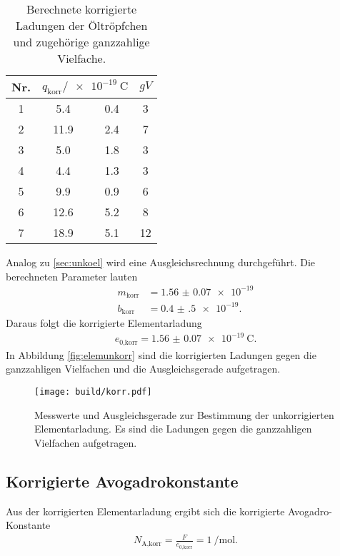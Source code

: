 \begin{table}[h]
  \centering
  \begin{tabular}{S S @{${}\pm{}$} S S}
    \toprule
    {Nr.} &  & {$gV$}\\
     & 5.4  & 0.4 & 3 \\
    2 & 11.9 & 2.4 & 7 \\
    3 & 5.0  & 1.8 & 3 \\
    4 & 4.4  & 1.3 & 3 \\
    5 & 9.9  & 0.9 & 6 \\
    6 & 12.6 & 5.2 & 8 \\
    7 & 18.9 & 5.1 & 12\\
    \bottomrule
  \end{tabular}
  \caption{Berechnete korrigierte Ladungen der Öltröpfchen und zugehörige
  ganzzahlige Vielfache.}
  \label{tab:Ladungenkorr}
\end{table}

\FloatBarrier

Analog zu \ref{sec:unkoel} wird eine Ausgleichsrechnung durchgeführt.
Die berechneten Parameter lauten
\begin{align}
  m_\text{korr} & = \num{1.56(7)e-19} \\
  b_\text{korr} & = \num{0.4(5)e-19}.
\end{align}
Daraus folgt die korrigierte Elementarladung
\begin{align}
  e_\text{0,korr} = \SI{1.56(7)e-19}{\coulomb}.
\end{align}
In Abbildung \ref{fig:elemunkorr} sind die korrigierten Ladungen gegen die ganzzahligen
Vielfachen und die Ausgleichsgerade aufgetragen.

\begin{figure}
  \centering
  \texttt{[image: build/korr.pdf]}
  \caption{Messwerte und Ausgleichsgerade zur Bestimmung der unkorrigierten Elementarladung.
  Es sind die Ladungen gegen die ganzzahligen Vielfachen aufgetragen.}
  \label{fig:elemkorr}
\end{figure}

\FloatBarrier

\subsection{Korrigierte Avogadrokonstante}

Aus der korrigierten Elementarladung ergibt sich die korrigierte Avogadro-Konstante
\begin{align}
  N_\text{A,korr} = \frac{F}{e_\text{0,korr}} = \SI{1}{\per\mol}.
\end{align}


